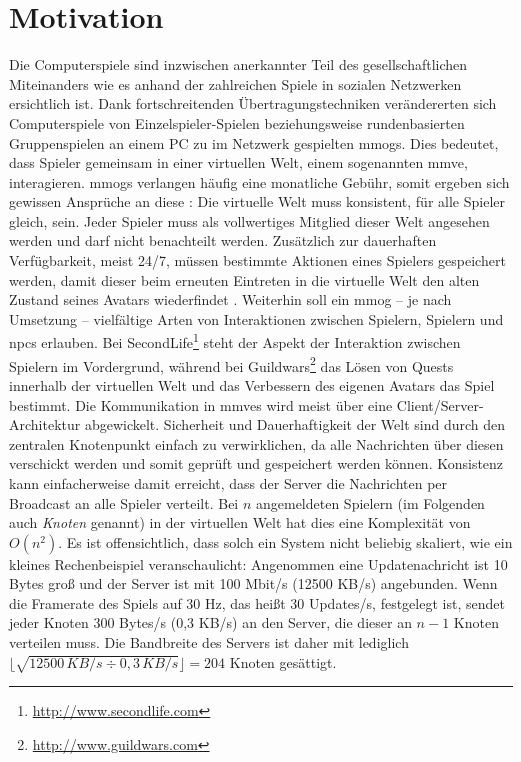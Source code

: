 \chapter{Motivation}
\label{chap:einleitung}
Die Computerspiele sind inzwischen anerkannter Teil des gesellschaftlichen Miteinanders wie es anhand der zahlreichen Spiele in sozialen Netzwerken ersichtlich ist. Dank fortschreitenden Übertragungs\-techniken verändererten sich Computerspiele von Einzelspieler-Spielen beziehungsweise rundenbasierten Gruppenspielen an einem PC zu im Netzwerk gespielten \acp{mmog}. Dies bedeutet, dass Spieler gemeinsam in einer virtuellen Welt, einem sogenannten \ac{mmve}, interagieren. \acp{mmog} verlangen häufig eine monatliche Gebühr, somit ergeben sich gewissen Ansprüche an diese \cite{Fischer2010a}: Die virtuelle Welt muss konsistent, für alle Spieler gleich, sein. Jeder Spieler muss als vollwertiges Mitglied dieser Welt angesehen werden und darf nicht benachteilt werden. Zusätzlich zur dauerhaften Verfügbarkeit, meist 24/7, müssen bestimmte Aktionen eines Spielers gespeichert werden, damit dieser beim erneuten Eintreten in die virtuelle Welt den alten Zustand seines Avatars wiederfindet \cite{Zhang2008Persistence}. Weiterhin soll ein \ac{mmog} -- je nach Umsetzung -- vielfältige Arten von Interaktionen zwischen Spielern, Spielern und \acp{npc} erlauben. Bei SecondLife\footnote{\url{http://www.secondlife.com}} steht der Aspekt der Interaktion zwischen Spielern im Vordergrund, während bei Guildwars\footnote{\url{http://www.guildwars.com}} das Lösen von Quests innerhalb der virtuellen Welt und das Verbessern des eigenen Avatars das Spiel bestimmt.
Die Kommunikation in \acp{mmve} wird meist über eine Client/Server-Architektur abgewickelt. Sicherheit und Dauerhaftigkeit der Welt sind durch den zentralen Knotenpunkt einfach zu verwirklichen, da alle Nachrichten über diesen verschickt werden und somit geprüft und gespeichert werden können. Konsistenz kann einfacherweise damit erreicht, dass der Server die Nachrichten per Broadcast an alle Spieler verteilt. Bei $n$ angemeldeten Spielern (im Folgenden auch \emph{Knoten} genannt) in der virtuellen Welt hat dies eine Komplexität von $O(n^2)$.  Es ist offensichtlich, dass solch ein System nicht beliebig skaliert, wie ein kleines Rechenbeispiel veranschaulicht: Angenommen eine Updatenachricht ist 10 Bytes groß und der Server ist mit 100 Mbit/s (12500 KB/s) angebunden. Wenn die Framerate des Spiels auf 30 Hz, das heißt 30 Updates/s, festgelegt ist, sendet jeder Knoten 300 Bytes/s (0,3 KB/s) an den Server, die dieser an $n-1$ Knoten verteilen muss. Die Bandbreite des Servers ist daher mit lediglich $\lfloor\sqrt{12500\,KB/s \div 0,3\,KB/s}\rfloor = 204$ Knoten gesättigt.
